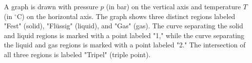 A graph is drawn with pressure \( p \) (in bar) on the vertical axis and temperature \( T \) (in \( ^\circ \text{C} \)) on the horizontal axis. The graph shows three distinct regions labeled "Fest" (solid), "Flüssig" (liquid), and "Gas" (gas). The curve separating the solid and liquid regions is marked with a point labeled "1," while the curve separating the liquid and gas regions is marked with a point labeled "2." The intersection of all three regions is labeled "Tripel" (triple point).
